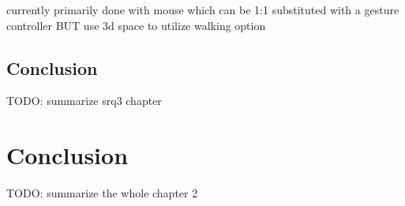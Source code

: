 currently primarily done with mouse which can be 1:1 substituted with a gesture controller
BUT use 3d space to utilize walking option



\subsection{Conclusion}

TODO: summarize srq3 chapter





\section{Conclusion}

\label{SectionLiteratureReviewConclusion}

TODO: summarize the whole chapter 2

